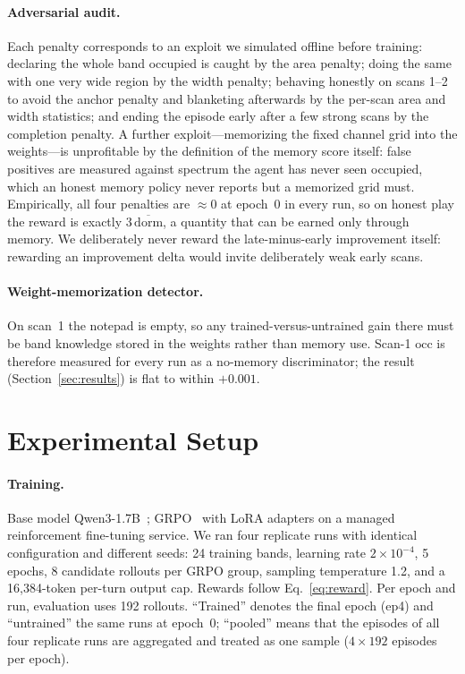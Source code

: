 \documentclass[11pt]{article}
\newcommand{\occ}{\ensuremath{\mathrm{occ}}}
\begin{document}
\paragraph{Adversarial audit.}
Each penalty corresponds to an exploit we simulated offline before training:
declaring the whole band occupied is caught by the area penalty; doing the same
with one very wide region by the width penalty; behaving honestly on scans 1--2 to
avoid the anchor penalty and blanketing afterwards by the per-scan area and width
statistics; and ending the episode early after a few strong scans by the completion
penalty. A further exploit---memorizing the fixed channel grid into the
weights---is unprofitable by the definition of the memory score itself: false
positives are measured against spectrum the agent has never seen occupied, which an
honest memory policy never reports but a memorized grid must. Empirically, all four
penalties are ${\approx}0$ at epoch~0 in every run, so on honest play the reward is
exactly $3\,\overline{\mathrm{dorm}}$, a quantity that can be earned only through
memory. We deliberately never reward the late-minus-early improvement itself:
rewarding an improvement delta would invite deliberately weak early scans.

\paragraph{Weight-memorization detector.}
On scan~1 the notepad is empty, so any trained-versus-untrained gain there must be
band knowledge stored in the weights rather than memory use. Scan-1 \occ{} is
therefore measured for every run as a no-memory discriminator; the result
(Section~\ref{sec:results}) is flat to within $+0.001$.

\section{Experimental Setup}
\label{sec:setup}

\paragraph{Training.}
Base model Qwen3-1.7B~\cite{qwen3}; GRPO~\cite{grpo} with LoRA adapters on a
managed reinforcement fine-tuning service. We ran four replicate runs with
identical configuration and different seeds: 24 training bands, learning rate
$2{\times}10^{-4}$, 5 epochs, 8 candidate rollouts per GRPO group, sampling
temperature 1.2, and a 16{,}384-token per-turn output cap. Rewards follow
Eq.~\eqref{eq:reward}. Per epoch and run, evaluation uses 192 rollouts.
``Trained'' denotes the final epoch (ep4) and ``untrained'' the same runs at
epoch~0; ``pooled'' means that the episodes of all four replicate runs are
aggregated and treated as one sample ($4 \times 192$ episodes per epoch).
\end{document}
